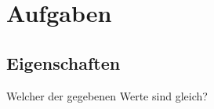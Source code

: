 \documentclass{article}
\begin{document}
    \section*{Aufgaben}

    \subsection*{Eigenschaften}

    Welcher der gegebenen Werte sind gleich?
\end{document}
